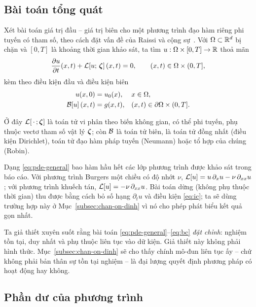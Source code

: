 \subsection{Bài toán tổng quát}
\label{subsec:bai-toan-tong-quat}
 
Xét bài toán giá trị đầu -- giá trị biên cho một phương trình đạo hàm riêng phi
tuyến có tham số, theo cách đặt vấn đề của Raissi và cộng sự~\cite{raissi2019}.
Với $\Omega \subset \mathbb{R}^{d}$ bị chặn và $[0,T]$ là khoảng thời gian khảo sát, ta
tìm $u : \Omega \times [0,T] \to \mathbb{R}$ thoả mãn
\begin{equation}
\frac{\partial u}{\partial t}(x,t) + \mathcal{L}\!\left[u;\, \bm{\zeta}\right](x,t) = 0,
\qquad (x,t) \in \Omega \times (0,T],
\label{eq:pde-general}
\end{equation}
kèm theo điều kiện đầu và điều kiện biên
\begin{align}
    u(x,0) &= u_{0}(x), && x \in \Omega, \label{eq:ic}\\
    \mathcal{B}\!\left[u\right](x,t) &= g(x,t),
      && (x,t) \in \partial\Omega \times (0,T].
    \label{eq:bc}
\end{align}
 
Ở đây $\mathcal{L}[\,\cdot\,;\bm{\zeta}]$ là toán tử vi phân theo biến không gian, có thể
phi tuyến, phụ thuộc vectơ tham số vật lý $\bm{\zeta}$; còn $\mathcal{B}$ là toán tử biên,
là toán tử đồng nhất (điều kiện Dirichlet), toán tử đạo hàm pháp tuyến (Neumann)
hoặc tổ hợp của chúng (Robin).
 
Dạng \eqref{eq:pde-general} bao hàm hầu hết các lớp phương trình được khảo sát
trong báo cáo. Với phương trình Burgers một chiều có độ nhớt $\nu$,
$\mathcal{L}[u] = u\,\partial_{x} u - \nu\, \partial_{xx} u$; với phương trình khuếch
tán, $\mathcal{L}[u] = -\nu\,\partial_{xx} u$. Bài toán dừng (không phụ thuộc thời gian)
thu được bằng cách bỏ số hạng $\partial_t u$ và điều kiện \eqref{eq:ic}; ta sẽ
dùng trường hợp này ở Mục~\ref{subsec:chan-on-dinh} vì nó cho phép phát biểu kết
quả gọn nhất.
 
Ta giả thiết xuyên suốt rằng bài toán \eqref{eq:pde-general}--\eqref{eq:bc}
\emph{đặt chỉnh}: nghiệm tồn tại, duy nhất và phụ thuộc liên tục vào dữ kiện. Giả
thiết này không phải hình thức. Mục~\ref{subsec:chan-on-dinh} sẽ cho thấy chính
mô-đun liên tục ấy -- chứ không phải bản thân sự tồn tại nghiệm -- là đại lượng
quyết định phương pháp có hoạt động hay không.
 
\subsection{Phần dư của phương trình}
\label{subsec:phan-du}
 
